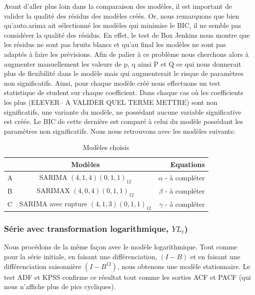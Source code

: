 \documentclass[12pt,a4paper]{book}
\newcommand{\1}{\mathds{1}}
\begin{document}
Avant d'aller plus loin dans la comparaison des modèles, il est important de valider la qualité des résidus des modèles créés. Or, nous remarquons que bien qu'auto.arima ait sélectionné les modèles qui minimise le BIC, il ne semble pas considérer la qualité des résidus. En effet, le test de Box Jenkins nous montre que les résidus ne sont pas bruits blancs et qu'au final les modèles ne sont pas adaptés à faire les prévisions. Afin de palier à ce problème nous cherchons alors à augmenter manuellement les valeurs de p, q ainsi P et Q ce qui nous donnerait plus de flexibilité dans le modèle mais qui augmenterait le risque de paramètres non significatifs. Ainsi, pour chaque modèle créé nous effectuons un test statistique de student sur chaque coefficient. Dans chaque cas où les coefficients les plus (ELEVER-- A VALIDER QUEL TERME METTRE) sont non significatifs, une variante du modèle, ne possédant aucune variable significative est créée. Le BIC de cette dernière est comparé à celui du modèle possédant les paramètres non significatifs. Nous nous retrouvons avec les modèles suivants:

\begin{table}[h!]
  \begin{center}
    \caption{Modèles choisis}
    \label{tab:table1}
    \begin{tabular}{l|c|r} %
      \ & \textbf{Modèles} & \textbf{Equations}\\
      \hline
      A & SARIMA $(4,1,4)(0,1,1)_{12}$ & $\alpha$ - à compléter\\
      B & SARIMAX $(4,0,4)(0,1,1)_{12}$& $\beta$ - à compléter\\
      C & SARIMA avec rupture $(4,1,3)(0,1,1)_{12}$ & $\gamma$ - à compléter\\
    \end{tabular}
  \end{center}
\end{table}



\vspace{5 mm}
\subsubsection{Série avec transformation logarithmique, $YL_t$)}

Nous procédons de la même façon avec le modèle logarithmique. Tout comme pour la série initiale, en faisant une différenciation, $(I-B)$ et en faisant une différenciation saisonnière $(I-B^{12})$, nous obtenons une modèle stationnaire. Le test ADF et KPSS confirme ce résultat tout comme les sorties ACF et PACF (qui nous n'affiche plus de pics cycliques). 
\end{document}
